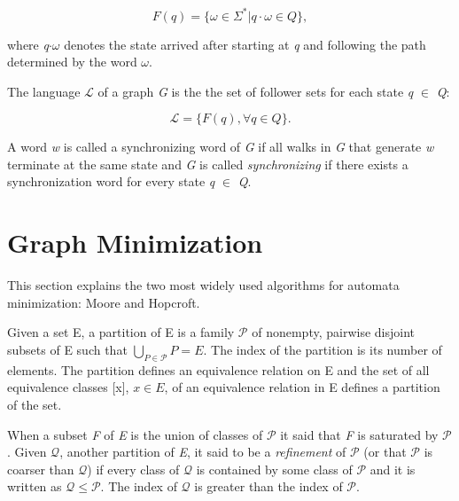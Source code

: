 {\[ F(q) = \{\omega \in \Sigma^* | q\cdot\omega \in \textit{Q}\}, \]



\noindent where \textit{q$\cdot\omega$} denotes the state arrived after starting at \textit{q} and following the path determined by the word $\omega$.


\begin{definition}\label{def:language}
The language $\mathcal{L}$ of a graph \textit{G} is the the set of follower sets for each state \textit{q} $\in$ \textit{Q}:
\end{definition}

\[ \mathcal{L} = \{F(\textit{q}), \forall \textit{q} \in \textit{Q}\}. \]

A word \textit{w} is called a synchronizing word of \textit{G} if all walks in \textit{G} that generate \textit{w} terminate at the same state and \textit{G} is called \textit{synchronizing} if there exists a synchronization word for every state \textit{q} $\in$ \textit{Q}. 

\section{Graph Minimization}

This section explains the two most widely used algorithms for automata minimization: Moore and Hopcroft.

\begin{definition}\label{def:partition}
Given a set E, a partition of E is a family $\mathcal{P}$ of nonempty, pairwise disjoint subsets of E such that $\bigcup_{P\in\mathcal{P}}P = E $. The index of the partition is its number of elements. The partition defines an equivalence relation on E and the set of all equivalence classes [x], $x\in E$, of an equivalence relation in E defines a partition of the set.
\end{definition}

When a subset \textit{F} of \textit{E} is the union of classes of $\mathcal{P}$ it said that \textit{F} is saturated by $\mathcal{P}$. Given $\mathcal{Q}$, another partition of \textit{E}, it said to be a \textit{refinement} of $\mathcal{P}$ (or that $\mathcal{P}$ is coarser than $\mathcal{Q}$) if every class of $\mathcal{Q}$ is contained by some class of $\mathcal{P}$ and it is written as $\mathcal{Q} \leq \mathcal{P}$. The index of $\mathcal{Q}$ is greater than the index of $\mathcal{P}$.

}
